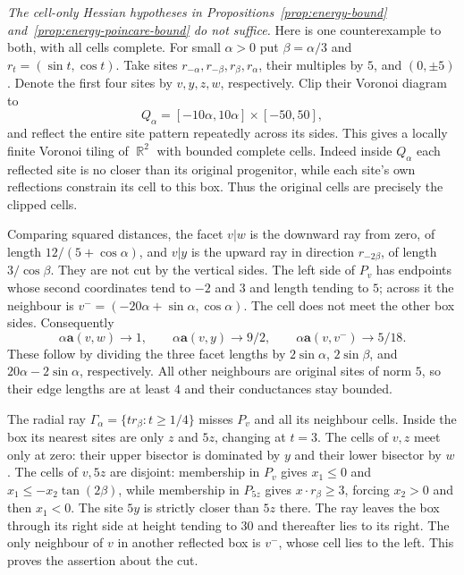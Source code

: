 \documentclass[12pt]{amsart}
\numberwithin{equation}{section}
\DeclareMathOperator{\R}{\mathbb{R}}
\newcommand{\cond}{\hyperref[eq:geometric-laplacian]{\mathbf{a}}}
\begin{document}
\smallskip
\noindent\emph{The cell-only Hessian hypotheses in Propositions~\ref{prop:energy-bound} and~\ref{prop:energy-poincare-bound} do not suffice.}
Here is one counterexample to both, with all cells complete. For small $\alpha>0$ put $\beta=\alpha/3$ and $r_t=(\sin t,\cos t)$. Take sites $r_{-\alpha},r_{-\beta},r_\beta,r_\alpha$, their multiples by $5$, and $(0,\pm5)$. Denote the first four sites by $v,y,z,w$, respectively. Clip their Voronoi diagram to
\[
 Q_\alpha=[-10\alpha,10\alpha]\times[-50,50],
\]
and reflect the entire site pattern repeatedly across its sides. This gives a locally finite Voronoi tiling of $\R^2$ with bounded complete cells. Indeed inside $Q_\alpha$ each reflected site is no closer than its original progenitor, while each site's own reflections constrain its cell to this box. Thus the original cells are precisely the clipped cells.

Comparing squared distances, the facet $v|w$ is the downward ray from zero, of length $12/(5+\cos\alpha)$, and $v|y$ is the upward ray in direction $r_{-2\beta}$, of length $3/\cos\beta$. They are not cut by the vertical sides. The left side of $P_v$ has endpoints whose second coordinates tend to $-2$ and $3$ and length tending to $5$; across it the neighbour is $v^-=(-20\alpha+\sin\alpha,\cos\alpha)$. The cell does not meet the other box sides. Consequently
\[
 \alpha\cond(v,w)\to1,\qquad
 \alpha\cond(v,y)\to9/2,\qquad
 \alpha\cond(v,v^-)\to5/18.
\]
These follow by dividing the three facet lengths by $2\sin\alpha$, $2\sin\beta$, and $20\alpha-2\sin\alpha$, respectively. All other neighbours are original sites of norm $5$, so their edge lengths are at least $4$ and their conductances stay bounded.

The radial ray $\Gamma_\alpha=\{t r_\beta:t\geq1/4\}$ misses $P_v$ and all its neighbour cells. Inside the box its nearest sites are only $z$ and $5z$, changing at $t=3$. The cells of $v,z$ meet only at zero: their upper bisector is dominated by $y$ and their lower bisector by $w$. The cells of $v,5z$ are disjoint: membership in $P_v$ gives $x_1\leq0$ and $x_1\leq-x_2\tan(2\beta)$, while membership in $P_{5z}$ gives $x\cdot r_\beta\geq3$, forcing $x_2>0$ and then $x_1<0$. The site $5y$ is strictly closer than $5z$ there. The ray leaves the box through its right side at height tending to $30$ and thereafter lies to its right. The only neighbour of $v$ in another reflected box is $v^-$, whose cell lies to the left. This proves the assertion about the cut.
\end{document}

